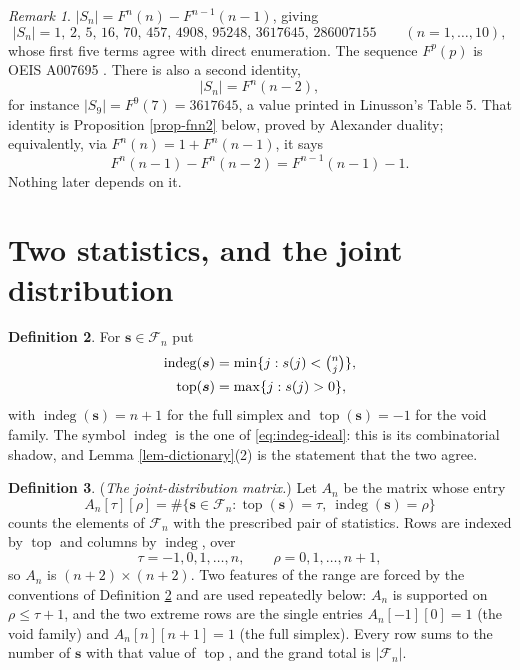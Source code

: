 \documentclass[11pt, a4paper, abstract=yes]{scrartcl}
\theoremstyle{definition}
\newtheorem{definition}{Definition}
\theoremstyle{remark}
\newtheorem{remark}[definition]{Remark}
\theoremstyle{plain}
\newcommand{\vek}[1]{\boldsymbol{#1}}
\newcommand{\indeg}{\operatorname{indeg}}
\newcommand{\tp}{\operatorname{top}}
\let\autocite\cite
\begin{document}
\begin{remark}
\(|S_n|=F^n(n)-F^{n-1}(n-1)\), giving
\begin{equation}\label{eq:auto-10}
  \lvert S_n\rvert = 1,\,2,\,5,\,16,\,70,\,457,\,4908,\,95248,\,3617645,\,286007155
  \qquad(n=1,\dots,10),
\end{equation}
whose first five terms agree with direct enumeration. The sequence \(F^p(p)\) is
OEIS A007695 \autocite{OEIS}. There is also a second identity,
\begin{equation}\label{eq:Sn-as-Fnn2}
  \lvert S_n\rvert=F^n(n-2),
\end{equation}
for instance \(|S_9|=F^9(7)=3617645\), a value printed in Linusson's Table 5. That identity is
Proposition \ref{prop-fnn2} below, proved by Alexander duality; equivalently, via
\(F^n(n)=1+F^n(n-1)\), it says
\begin{equation}\label{eq:Fnn2-equivalent}
  F^n(n-1)-F^n(n-2)=F^{n-1}(n-1)-1 .
\end{equation}
Nothing later depends on it.
\label{obs-fnn2}
\end{remark}
\section{Two statistics, and the joint distribution}
\label{sec-statistics}
\begin{definition}
For \(\vek s\in\mathcal F_n\) put
\begin{align}
  \indeg(\vek s) &= \min\lbrace j:s(j)<\tbinom nj\rbrace,\label{eq:def-indeg}\\
  \tp(\vek s) &= \max\lbrace j:s(j)>0\rbrace,\label{eq:def-top}
\end{align}
with \(\indeg(\vek s)=n+1\) for the full simplex and \(\tp(\vek s)=-1\) for the void family. The
symbol \(\indeg\) is the one of \eqref{eq:indeg-ideal}: this is its combinatorial shadow, and
Lemma \ref{lem-dictionary}(2) is the statement that the two agree.
\label{def-stats}
\end{definition}

\begin{definition}
(\emph{The joint-distribution matrix.}) Let \(A_n\) be the matrix whose entry
\begin{equation}\label{eq:def-A}
  A_n[\tau][\rho]=\#\bigl\lbrace \vek s\in\mathcal F_n:\tp(\vek s)=\tau,\ \indeg(\vek s)=\rho\bigr\rbrace
\end{equation}
counts the elements of \(\mathcal F_n\) with the prescribed pair of statistics. Rows are indexed by
\(\tp\) and columns by \(\indeg\), over
\begin{equation}\label{eq:def-A-range}
  \tau=-1,0,1,\dots,n,\qquad \rho=0,1,\dots,n+1 ,
\end{equation}
so \(A_n\) is \((n+2)\times(n+2)\). Two features of the range are forced by the conventions of
Definition \ref{def-stats} and are used repeatedly below: \(A_n\) is supported on \(\rho\le\tau+1\), and
the two extreme rows are the single entries \(A_n[-1][0]=1\) (the void family) and \(A_n[n][n+1]=1\)
(the full simplex). Every row sums to the number of \(\vek s\) with that value of \(\tp\), and the
grand total is \(\lvert\mathcal F_n\rvert\).
\label{def-A}
\end{definition}
\end{document}
